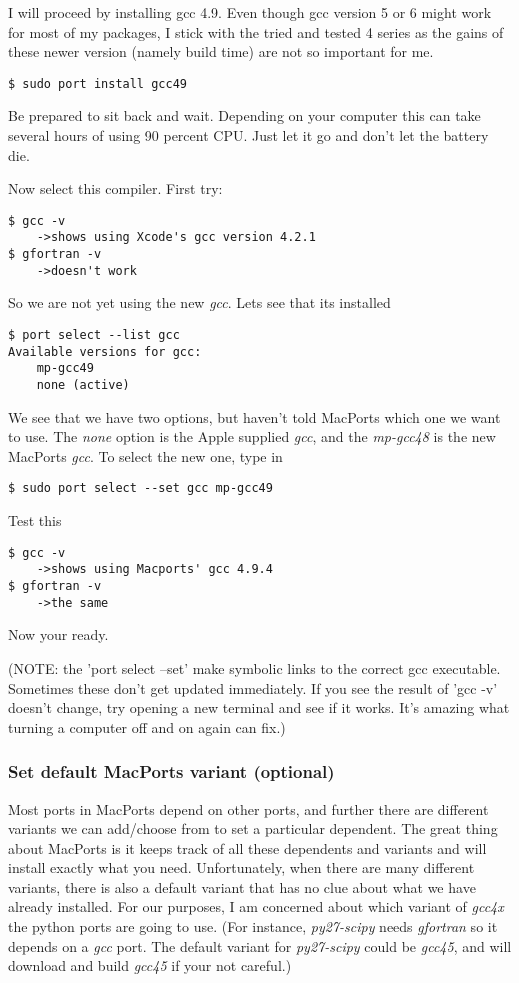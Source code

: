 \documentclass[11pt]{article}
\begin{document}
I will proceed by installing gcc 4.9. Even though gcc version 5 or 6 might work for most of my packages, I stick with the tried and tested 4 series as the gains of these newer version (namely build time) are not so important for me.
\begin{lstlisting}[style=Bash]
$ sudo port install gcc49
\end{lstlisting}
Be prepared to sit back and wait. Depending on your computer this can take several hours of using 90 percent CPU. Just let it go and don't let the battery die.

Now select this compiler. First try:
\begin{lstlisting}[style=Bash]
$ gcc -v
    ->shows using Xcode's gcc version 4.2.1
$ gfortran -v 
    ->doesn't work
\end{lstlisting}
So we are not yet using the new \textit{gcc}. Lets see that its installed
\begin{lstlisting}[style=Bash]
$ port select --list gcc
Available versions for gcc:
	mp-gcc49
	none (active)
\end{lstlisting}
We see that we have two options, but haven't told MacPorts which one we want to use. The \textit{none} option is the Apple supplied \textit{gcc}, and the \textit{mp-gcc48} is the new MacPorts \textit{gcc}. To select the new one, type in
\begin{lstlisting}[style=Bash]
$ sudo port select --set gcc mp-gcc49
\end{lstlisting}
Test this
\begin{lstlisting}[style=Bash]
$ gcc -v
    ->shows using Macports' gcc 4.9.4
$ gfortran -v
    ->the same
\end{lstlisting}
Now your ready. 

(NOTE: the 'port select --set' make symbolic links to the correct gcc executable. Sometimes these don't get updated immediately. If you see the result of 'gcc -v' doesn't change, try opening a new terminal and see if it works. It's amazing what turning a computer off and on again can fix.)


\subsubsection{Set default MacPorts variant (optional)}
Most ports in MacPorts depend on other ports, and further there are different variants we can add/choose from to set a particular dependent. The great thing about MacPorts is it keeps track of all these dependents and variants and will install exactly what you need. Unfortunately, when there are many different variants, there is also a default variant that has no clue about what we have already installed. For our purposes, I am concerned about which variant of \textit{gcc4x} the python ports are going to use. (For instance, \textit{py27-scipy} needs \textit{gfortran} so it depends on a \textit{gcc} port. The default variant for \textit{py27-scipy} could be \textit{gcc45}, and will download and build \textit{gcc45} if your not careful.)
\end{document}
